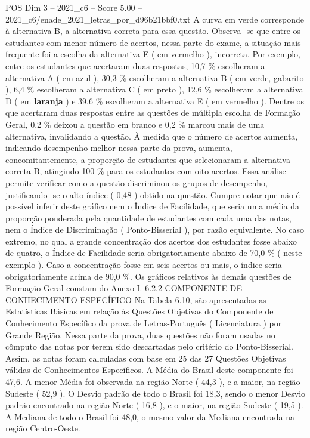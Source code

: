 \begin{textsample}{POS Dim 3 – 2021\_c6 – Score 5.00 – 2021\_c6/enade\_2021\_letras\_por\_d96b21bbf0.txt}
A curva em verde corresponde à alternativa B, a alternativa correta para essa questão.
Observa -se que entre os estudantes com menor número de acertos, nessa parte do exame, a situação mais frequente foi a escolha da alternativa E ( em vermelho ), incorreta.
Por exemplo, entre os estudantes que acertaram duas respostas, 10,7 \% escolheram a alternativa A ( em azul ), 30,3 \% escolheram a alternativa B ( em verde, gabarito ), 6,4 \% escolheram a alternativa C ( em preto ), 12,6 \% escolheram a alternativa D ( em \textbf{laranja} ) e 39,6 \% escolheram a alternativa E ( em vermelho ).
Dentre os que acertaram duas respostas entre as questões de múltipla escolha de Formação Geral, 0,2 \% deixou a questão em branco e 0,2 \% marcou mais de uma alternativa, invalidando a questão.
À medida que o número de acertos aumenta, indicando desempenho melhor nessa parte da prova, aumenta, concomitantemente, a proporção de estudantes que selecionaram a alternativa correta B, atingindo 100 \% para os estudantes com oito acertos.
Essa análise permite verificar como a questão discriminou os grupos de desempenho, justificando -se o alto índice ( 0,48 ) obtido na questão.
Cumpre notar que não é possível inferir deste gráfico nem o Índice de Facilidade, que seria uma média da proporção ponderada pela quantidade de estudantes com cada uma das notas, nem o Índice de Discriminação ( Ponto-Bisserial ), por razão equivalente.
No caso extremo, no qual a grande concentração dos acertos dos estudantes fosse abaixo de quatro, o Índice de Facilidade seria obrigatoriamente abaixo de 70,0 \% ( neste exemplo ).
Caso a concentração fosse em seis acertos ou mais, o índice seria obrigatoriamente acima de 90,0 \%.
Os gráficos relativos às demais questões de Formação Geral constam do Anexo I. 6.2.2 COMPONENTE DE CONHECIMENTO ESPECÍFICO Na Tabela 6.10, são apresentadas as Estatísticas Básicas em relação às Questões Objetivas do Componente de Conhecimento Específico da prova de Letras-Português ( Licenciatura ) por Grande Região.
Nessa parte da prova, duas questões não foram usadas no cômputo das notas por terem sido descartadas pelo critério do Ponto-Bisserial.
Assim, as notas foram calculadas com base em 25 das 27 Questões Objetivas válidas de Conhecimentos Específicos.
A Média do Brasil deste componente foi 47,6.
A menor Média foi observada na região Norte ( 44,3 ), e a maior, na região Sudeste ( 52,9 ).
O Desvio padrão de todo o Brasil foi 18,3, sendo o menor Desvio padrão encontrado na região Norte ( 16,8 ), e o maior, na região Sudeste ( 19,5 ).
A Mediana de todo o Brasil foi 48,0, o mesmo valor da Mediana encontrada na região Centro-Oeste.

\end{textsample}
